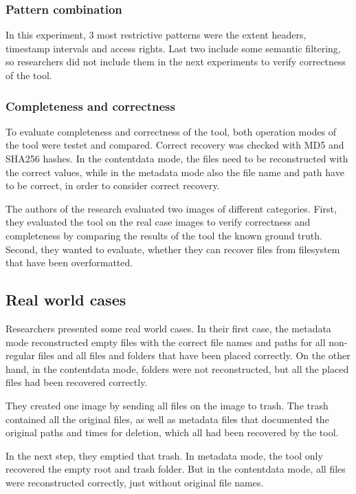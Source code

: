 \documentclass{acm_proc_article-sp}
\begin{document}
\subsubsection{Pattern combination}

In this experiment, 3 most restrictive patterns were the extent headers, timestamp intervals and access rights. Last two include some semantic filtering, so researchers did not include them in the next experiments to verify correctness of the tool.

\subsubsection{Completeness and correctness}

To evaluate completeness and correctness of the tool, both operation modes of the tool were testet and compared. Correct recovery was checked with MD5 and SHA256 hashes. In the contentdata mode, the files need to be reconstructed with the correct values, while in the metadata mode also the file name and path have to be correct, in order to consider correct recovery.

The authors of the research evaluated two images of different categories. First, they evaluated the tool on the real case images to verify correctness and completeness by comparing the results of the tool the known ground truth. Second, they wanted to evaluate, whether they can recover files from filesystem that have been overformatted.

\subsection{Real world cases}

Researchers presented some real world cases. In their first case, the metadata mode reconstructed empty files with the correct file names and paths for all non-regular files and all files and folders that have been
placed correctly. On the other hand, in the contentdata mode, folders were not reconstructed, but all the placed files had been recovered correctly.

They created one image by sending all files on the image to trash. The trash contained all the original files, as well as metadata files that documented the original paths and times for deletion, which all had been recovered by the tool.

In the next step, they emptied that trash. In metadata mode, the tool only recovered the empty root and trash folder. But in the contentdata mode, all files were reconstructed correctly, just without original file names. 
\end{document}
